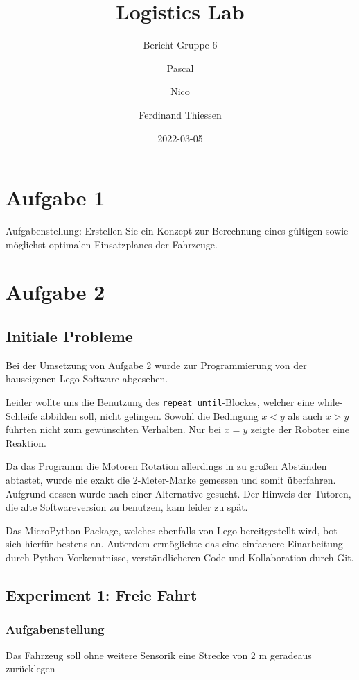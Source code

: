 \documentclass[ngerman]{tudscrreprt}
\newcommand{\code}[1]{\texttt{#1}}
\begin{document}
\date{2022-03-05}
\author{%
Pascal%
%
\and%
Nico%
%
\and%
Ferdinand Thiessen%
%
}
\title{Logistics Lab}
\subtitle{Bericht Gruppe 6}
\maketitle

\tableofcontents

\chapter{Aufgabe 1}
Aufgabenstellung: Erstellen Sie ein Konzept zur Berechnung eines gültigen sowie möglichst optimalen Einsatzplanes der Fahrzeuge.

\chapter{Aufgabe 2}
\section{Initiale Probleme}
Bei der Umsetzung von Aufgabe 2 wurde zur Programmierung von der hauseigenen Lego Software abgesehen.

Leider wollte uns die Benutzung des \code{repeat until}-Blockes, welcher eine while-Schleife abbilden soll, nicht gelingen.
Sowohl die Bedingung $x < y$ als auch $x > y$ führten nicht zum gewünschten Verhalten.
Nur bei $x = y$ zeigte der Roboter eine Reaktion.

Da das Programm die Motoren Rotation allerdings in zu großen Abständen abtastet, wurde nie exakt die 2-Meter-Marke gemessen und somit überfahren.
Aufgrund dessen wurde nach einer Alternative gesucht. Der Hinweis der Tutoren, die alte Softwareversion zu benutzen, kam leider zu spät.

Das MicroPython Package, welches ebenfalls von Lego bereitgestellt wird, bot sich hierfür bestens an.
Außerdem ermöglichte das eine einfachere Einarbeitung durch Python-Vorkenntnisse, verständlicheren Code und Kollaboration durch Git.


\section{Experiment 1: Freie Fahrt}
\subsection{Aufgabenstellung}
Das Fahrzeug soll ohne weitere Sensorik eine Strecke von 2 m geradeaus
zurücklegen
\end{document}

